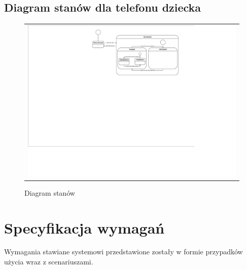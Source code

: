 \documentclass{sprawozdanie-agh}
\begin{document}
		\subsection{Diagram stanów dla telefonu dziecka}
		
		\begin{figure}[H]
			\centering
			\begin{tabular}{c}
				\includegraphics[width=.95\textwidth]{Stanu_cropped} 
			\end{tabular}
			\caption{Diagram stanów}
		\end{figure}

	\section{Specyfikacja wymagań}

		Wymagania stawiane systemowi przedstawione zostały w formie przypadków użycia wraz z scenariuszami.
\end{document}
